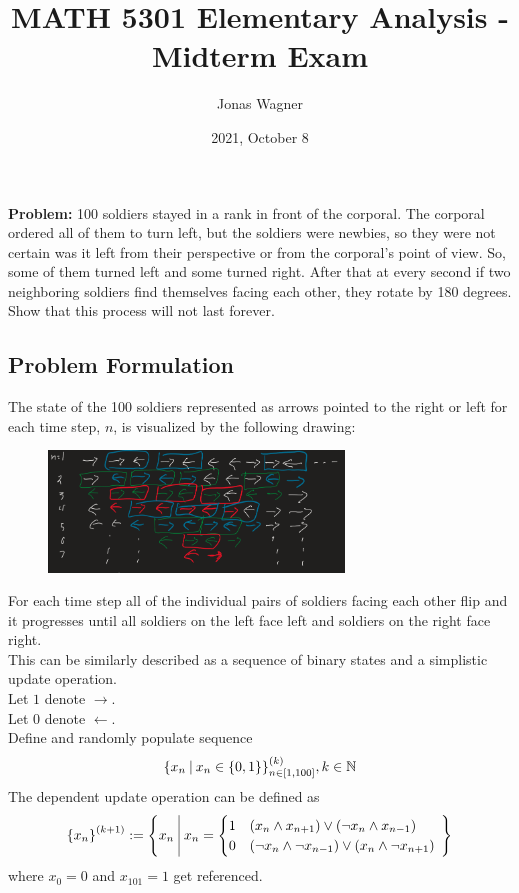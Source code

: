 \documentclass[]{article}
\title{MATH 5301 Elementary Analysis - Midterm Exam}
\author{Jonas Wagner}
\date{2021, October 8}
\newcommand{\N}{\mathbb{N}}
\newcommand{\st}{ \ \vline \ }
\begin{document}
\maketitle

\section{}
\textbf{Problem:} 100 soldiers stayed in a rank in front of the corporal. 
The corporal ordered all of them to turn left, but the soldiers were newbies, 
so they were not certain was it left from their perspective or from the corporal’s 
point of view. So, some of them turned left and some turned right. After that 
at every second if two neighboring soldiers find themselves facing each other,
they rotate by 180 degrees. Show that this process will not last forever.

\subsection*{Problem Formulation}
The state of the 100 soldiers represented as arrows pointed to the right or left 
for each time step, $n$, is visualized by the following drawing:\\
\begin{figure}[h]
    \centering
    \includegraphics[width=0.7\textwidth]{MidExam1_pblm1_a.png}
\end{figure}

For each time step all of the individual pairs of soldiers facing each other 
flip and it progresses until all soldiers on the left face left and soldiers 
on the right face right.\\

This can be similarly described as a sequence of binary states and a simplistic update 
operation.\\
Let $1$ denote $\rightarrow$.\\
Let $0$ denote $\leftarrow$.\\
Define and randomly populate sequence 
$$\qty{x_n \st x_n \in \{0,1\} }_{n \in [1,100]}^{(k)}, k \in \N$$
The dependent update operation can be defined as 
$$\qty{x_n}^{(k+1)} 
    := \qty{x_n \st x_n = 
    \begin{cases}
        1   & (x_n \land x_{n+1}) \lor (\lnot x_n \land x_{n-1})\\
        0   & (\lnot x_n \land \lnot x_{n-1}) \lor (x_n \land \lnot x_{n+1})
    \end{cases}
    \
    }
$$
where $x_0 = 0$ and $x_{101} = 1$ get referenced.\\
\end{document}
